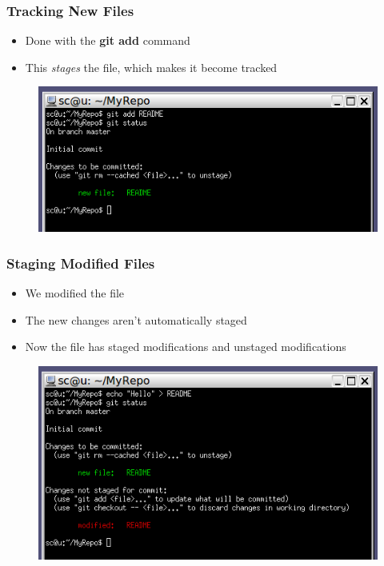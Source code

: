 \documentclass{beamer}
\begin{document}
\begin{frame}
	\frametitle{Tracking New Files}
	\begin{itemize}
		\item{Done with the \textbf{git add} command}
		\item{This \textit{stages} the file, which makes it become tracked}
	\end{itemize}
	\begin{figure}
		\includegraphics[scale=0.54]{Tracking_New_Files-0.png}
	\end{figure}
\end{frame}

\begin{frame}
	\frametitle{Staging Modified Files}
	\begin{itemize}
		\item{We modified the file}
		\item{The new changes aren't automatically staged}
		\item{Now the file has staged modifications and unstaged modifications}
	\end{itemize}
	\begin{figure}
		\includegraphics[scale=0.55]{Staging_Modified_Files-0.png}
	\end{figure}
\end{frame}
\end{document}
